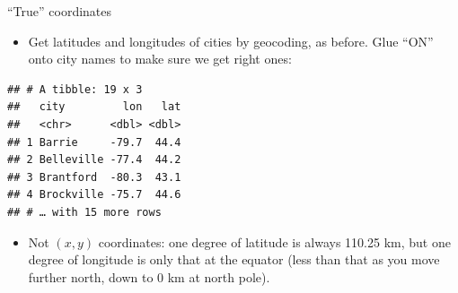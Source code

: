\documentclass[ignorenonframetext,]{beamer}
\newenvironment{Shaded}{\begin{snugshade}}{\end{snugshade}}
\newcommand{\DataTypeTok}[1]{\textcolor[rgb]{0.13,0.29,0.53}{#1}}
\newcommand{\DecValTok}[1]{\textcolor[rgb]{0.00,0.00,0.81}{#1}}
\newcommand{\KeywordTok}[1]{\textcolor[rgb]{0.13,0.29,0.53}{\textbf{#1}}}
\newcommand{\NormalTok}[1]{#1}
\newcommand{\OperatorTok}[1]{\textcolor[rgb]{0.81,0.36,0.00}{\textbf{#1}}}
\newcommand{\StringTok}[1]{\textcolor[rgb]{0.31,0.60,0.02}{#1}}
\providecommand{\tightlist}{%
  \setlength{\itemsep}{0pt}\setlength{\parskip}{0pt}}
\begin{document}
\begin{frame}[fragile]{``True'' coordinates}
\protect\hypertarget{true-coordinates}{}

\begin{itemize}
\tightlist
\item
  Get latitudes and longitudes of cities by geocoding, as before. Glue
  ``ON'' onto city names to make sure we get right ones:
\end{itemize}

\begin{Shaded}
\end{Shaded}

\begin{verbatim}
## # A tibble: 19 x 3
##   city         lon   lat
##   <chr>      <dbl> <dbl>
## 1 Barrie     -79.7  44.4
## 2 Belleville -77.4  44.2
## 3 Brantford  -80.3  43.1
## 4 Brockville -75.7  44.6
## # … with 15 more rows
\end{verbatim}

\begin{itemize}
\tightlist
\item
  Not \((x,y)\) coordinates: one degree of latitude is always 110.25 km,
  but one degree of longitude is only that at the equator (less than
  that as you move further north, down to 0 km at north pole).
\end{itemize}

\end{frame}
\end{document}
